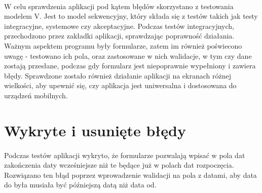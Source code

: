 \paragraph{}
W celu sprawdzenia aplikacji pod kątem błędów skorzystano z testowania modelem V. Jest to model sekwencyjny, który składa się z testów takich jak testy integracyjne, systemowe czy akceptacyjne. Podczas testów integracyjnych, przechodzono przez zakładki aplikacji, sprawdzając poprawność działania. Ważnym aspektem programu były formularze, zatem im również poświecono uwagę - testowano ich pola, oraz zastosowane w nich walidacje, w tym czy dane zostają przesłane, podczas gdy formularz jest niepoprawnie wypełniony i zawiera błędy. Sprawdzone zostało również działanie aplikacji na ekranach różnej wielkości, aby upewnić się, czy aplikacja jest uniwersalna i dostosowana do urządzeń mobilnych.

\section{Wykryte i usunięte błędy}
\paragraph{}
Podczas testów aplikacji wykryto, że formularze pozwalają wpisać w pola dat zakończenia daty wcześniejsze niż te będące już w polach dat rozpoczęcia. Rozwiązano ten błąd poprzez wprowadzenie walidacji na pola z datami, aby data do była musiała być późniejszą datą niż data od.

